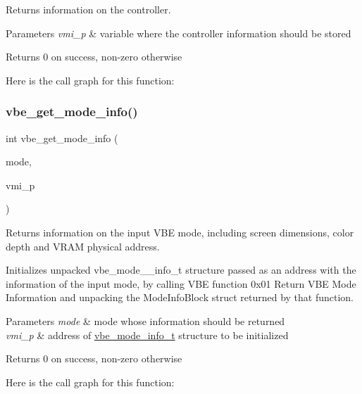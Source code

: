 Returns information on the controller. 


\begin{DoxyParams}{Parameters}
{\em vmi\+\_\+p} & variable where the controller information should be stored\\
\hline
\end{DoxyParams}
\begin{DoxyReturn}{Returns}
0 on success, non-\/zero otherwise 
\end{DoxyReturn}
Here is the call graph for this function\+:
\hypertarget{group__vbe_ga4ef3234e41f2050bc094a22049b69e45}{}\label{group__vbe_ga4ef3234e41f2050bc094a22049b69e45} 
\subsubsection{\texorpdfstring{vbe\+\_\+get\+\_\+mode\+\_\+info()}{vbe\_get\_mode\_info()}}
{\footnotesize\ttfamily int vbe\+\_\+get\+\_\+mode\+\_\+info (\begin{DoxyParamCaption}\item[{unsigned short}]{mode,  }\item[{\hyperlink{structvbe__mode__info__t}{vbe\+\_\+mode\+\_\+info\+\_\+t} $\ast$}]{vmi\+\_\+p }\end{DoxyParamCaption})}



Returns information on the input V\+BE mode, including screen dimensions, color depth and V\+R\+AM physical address. 

Initializes unpacked vbe\+\_\+mode\+\_\+\+\_\+info\+\_\+t structure passed as an address with the information of the input mode, by calling V\+BE function 0x01 Return V\+BE Mode Information and unpacking the Mode\+Info\+Block struct returned by that function.


\begin{DoxyParams}{Parameters}
{\em mode} & mode whose information should be returned \\
\hline
{\em vmi\+\_\+p} & address of \hyperlink{structvbe__mode__info__t}{vbe\+\_\+mode\+\_\+info\+\_\+t} structure to be initialized \\
\hline
\end{DoxyParams}
\begin{DoxyReturn}{Returns}
0 on success, non-\/zero otherwise 
\end{DoxyReturn}
Here is the call graph for this function\+:
